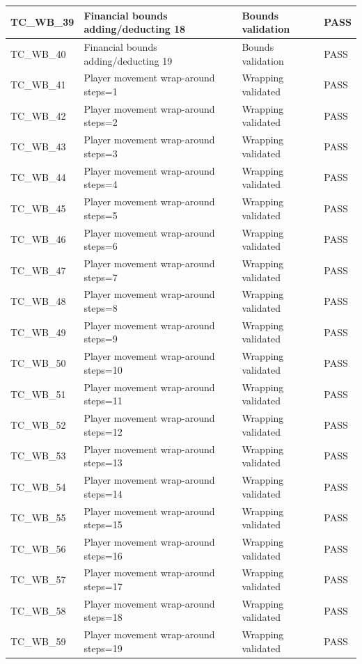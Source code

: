 \documentclass{article}
\begin{document}
\begin{longtable}{|p{2cm}|p{8cm}|p{3cm}|p{2cm}|}
\hline
TC\_WB\_39 & Financial bounds adding/deducting 18 & Bounds validation & PASS \\
\hline
TC\_WB\_40 & Financial bounds adding/deducting 19 & Bounds validation & PASS \\
\hline
TC\_WB\_41 & Player movement wrap-around steps=1 & Wrapping validated & PASS \\
\hline
TC\_WB\_42 & Player movement wrap-around steps=2 & Wrapping validated & PASS \\
\hline
TC\_WB\_43 & Player movement wrap-around steps=3 & Wrapping validated & PASS \\
\hline
TC\_WB\_44 & Player movement wrap-around steps=4 & Wrapping validated & PASS \\
\hline
TC\_WB\_45 & Player movement wrap-around steps=5 & Wrapping validated & PASS \\
\hline
TC\_WB\_46 & Player movement wrap-around steps=6 & Wrapping validated & PASS \\
\hline
TC\_WB\_47 & Player movement wrap-around steps=7 & Wrapping validated & PASS \\
\hline
TC\_WB\_48 & Player movement wrap-around steps=8 & Wrapping validated & PASS \\
\hline
TC\_WB\_49 & Player movement wrap-around steps=9 & Wrapping validated & PASS \\
\hline
TC\_WB\_50 & Player movement wrap-around steps=10 & Wrapping validated & PASS \\
\hline
TC\_WB\_51 & Player movement wrap-around steps=11 & Wrapping validated & PASS \\
\hline
TC\_WB\_52 & Player movement wrap-around steps=12 & Wrapping validated & PASS \\
\hline
TC\_WB\_53 & Player movement wrap-around steps=13 & Wrapping validated & PASS \\
\hline
TC\_WB\_54 & Player movement wrap-around steps=14 & Wrapping validated & PASS \\
\hline
TC\_WB\_55 & Player movement wrap-around steps=15 & Wrapping validated & PASS \\
\hline
TC\_WB\_56 & Player movement wrap-around steps=16 & Wrapping validated & PASS \\
\hline
TC\_WB\_57 & Player movement wrap-around steps=17 & Wrapping validated & PASS \\
\hline
TC\_WB\_58 & Player movement wrap-around steps=18 & Wrapping validated & PASS \\
\hline
TC\_WB\_59 & Player movement wrap-around steps=19 & Wrapping validated & PASS \\

\end{longtable}
\end{document}
